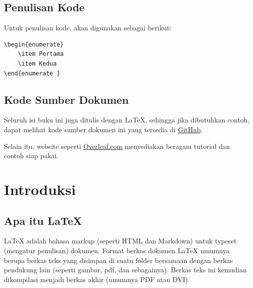 \documentclass{book} %
\begin{document}
	\section{Penulisan Kode}
	Untuk penulisan kode, akan digunakan sebagai berikut:

    \begin{verbatim}
\begin{enumerate}
    \item Pertama
    \item Kedua
\end{enumerate }
    \end{verbatim}

    \section{Kode Sumber Dokumen}

    Seluruh isi buku ini juga ditulis dengan \LaTeX{}, sehingga jika dibutuhkan contoh, dapat melihat
    kode sumber dokumen ini yang tersedia di \href{https://github.com/mekatronik-achmadi/my_latexbook/blob/master/Modul/LaTex/latex_beginner.tex}{GitHub}.

    \bigskip

    Selain itu, website seperti \href{https://www.overleaf.com/}{Overleaf.com} menyediakan beragam tutorial dan contoh siap pakai.


    \mainmatter %

    \newpage
    \chapter{Introduksi}

    \section{Apa itu \LaTeX{}}

    \LaTeX{} adalah bahasa markup (seperti HTML dan Markdown) untuk typeset (mengatur penulisan) dokumen.
    Format berkas dokumen \LaTeX{} umumnya berupa berkas teks yang disimpan di suatu folder
    bersamaan dengan berkas pendukung lain (seperti gambar, pdf, dan sebagainya).
    Berkas teks ini kemudian dikompilasi menjadi berkas akhir (umumnya PDF atau DVI).
\end{document}

